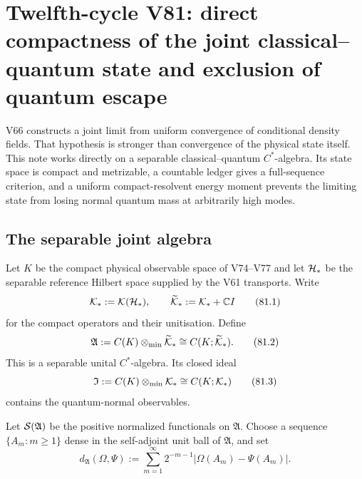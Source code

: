 \documentclass[11pt]{article}
\theoremstyle{remark}
\begin{document}


\section{Twelfth-cycle V81: direct compactness of the joint
classical--quantum state and exclusion of quantum escape}
\label{sec:v12v81}

V66 constructs a joint limit from uniform convergence of conditional
density fields.  That hypothesis is stronger than convergence of the
physical state itself.  This note works directly on a separable
classical--quantum \(C^*\)-algebra.  Its state space is compact and
metrizable, a countable ledger gives a full-sequence criterion, and a
uniform compact-resolvent energy moment prevents the limiting state
from losing normal quantum mass at arbitrarily high modes.

\subsection{The separable joint algebra}

Let \(K\) be the compact physical observable space of V74--V77 and
let \({\cal H}_*\) be the separable reference Hilbert space supplied
by the V61 transports.  Write
\[
 {\cal K}_*:={\cal K}({\cal H}_*),\qquad
 \widetilde{\cal K}_*:={\cal K}_*+\mathbb C I              \tag{81.1}
\]
for the compact operators and their unitisation.  Define
\begin{equation}
 {\mathfrak A}
 :=C(K)\otimes_{\min}\widetilde{\cal K}_*
 \cong C(K;\widetilde{\cal K}_*).                            \tag{81.2}
\end{equation}
This is a separable unital \(C^*\)-algebra.  Its closed ideal
\begin{equation}
 {\mathfrak I}
 :=C(K)\otimes_{\min}{\cal K}_*
 \cong C(K;{\cal K}_*)                                      \tag{81.3}
\end{equation}
contains the quantum-normal observables.

Let \({\cal S}({\mathfrak A})\) be the positive normalized
functionals on \({\mathfrak A}\).  Choose a sequence
\(\{A_m:m\geq1\}\) dense in the self-adjoint unit ball of
\({\mathfrak A}\), and set
\begin{equation}
 d_{\mathfrak A}(\Omega,\Psi)
 :=
 \sum_{m=1}^{\infty}2^{-m-1}
 |\Omega(A_m)-\Psi(A_m)|.                                   \tag{81.4}
\end{equation}
\end{document}

